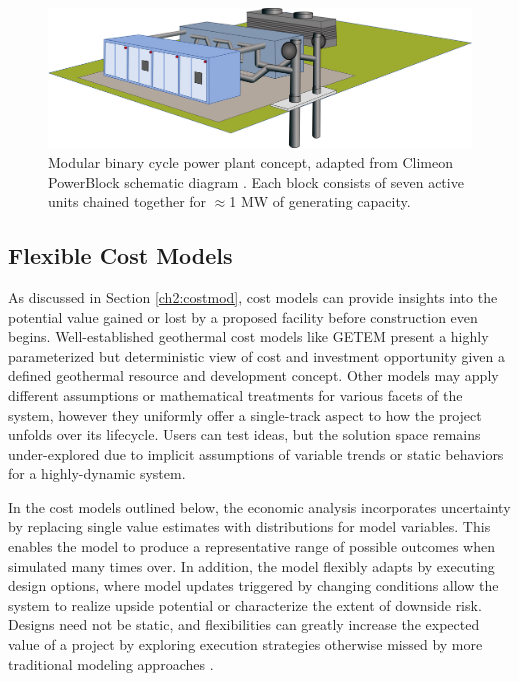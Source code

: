\begin{figure}[!htp]
\centering
\includegraphics[width=\textwidth]{templates/images/Figure-Climeon-PowerBlock.png}
\caption[Modular power plant schematic]{Modular binary cycle power plant concept, adapted from Climeon PowerBlock schematic diagram \protect\citep{climeon_climeon_2021-1}. Each block consists of seven active units chained together for $\approx$1 MW of generating capacity.}
\label{fig:climeon_powerblock}
\end{figure}

\subsection{Flexible Cost Models}
As discussed in Section \ref{ch2:costmod}, cost models can provide insights into the potential value gained or lost by a proposed facility before construction even begins. Well-established geothermal cost models like GETEM \citep{entingh_volume_2006} present a highly parameterized but deterministic view of cost and investment opportunity given a defined geothermal resource and development concept. Other models may apply different assumptions or mathematical treatments for various facets of the system, however they uniformly offer a single-track aspect to how the project unfolds over its lifecycle. Users can test ideas, but the solution space remains under-explored due to implicit assumptions of variable trends or static behaviors for a highly-dynamic system.  

In the cost models outlined below, the economic analysis incorporates uncertainty by replacing single value estimates with distributions for model variables. This enables the model to produce a representative range of possible outcomes when simulated many times over. In addition, the model flexibly adapts by executing design options, where model updates triggered by changing conditions allow the system to realize upside potential or characterize the extent of downside risk. Designs need not be static, and flexibilities can greatly increase the expected value of a project by exploring execution strategies otherwise missed by more traditional modeling approaches \citep[chap.6]{de_neufville_flexibility_2011}.

